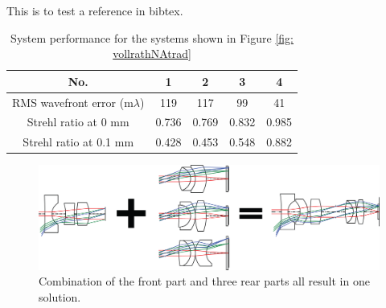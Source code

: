\documentclass{article}
\begin{document}
This is to test a reference in bibtex. \cite{book:Shannon1997}







\setlength{\arrayrulewidth}{.5mm}
\setlength{\tabcolsep}{18pt}
\renewcommand{\arraystretch}{1.2}
\begin{table}[h!]
    \centering
    \captionsetup{justification=centering}
    \caption{System performance for the systems shown in Figure \ref{fig: vollrathNAtrad}}
    \label{table: vollrathNAtrad}
    \vspace{-1em}
    \begin{adjustbox}{max width=\textwidth, center}
    \begin{tabular}{c c c c c}
    \hline 
     No. & 1 & 2 & 3 & 4\\ 
     \midrule
    RMS wavefront error (m$\lambda$) & 119 & 117 & 99 & 41 \\ 
    Strehl ratio at 0 mm & 0.736 & 0.769 & 0.832 & 0.985\\
    Strehl ratio at 0.1 mm & 0.428 & 0.453 & 0.548 & 0.882\\
    \hline
    \end{tabular}
    \end{adjustbox}
\end{table}

\begin{figure}[h!]
    \centering
    \includegraphics[width=\textwidth]{chapter-4/figures/WAL_combine.png}
    \caption{Combination of the front part and three rear parts all result in one solution.}
    \label{fig:WAL_combine}
\end{figure}
\end{document}
